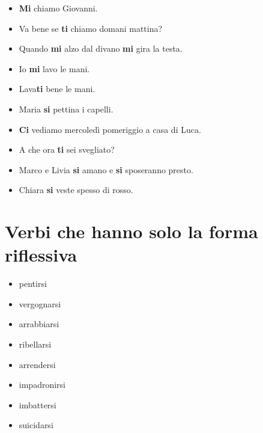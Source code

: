 \documentclass[letter,11pt]{article}
\begin{document}
\begin{multicols}{2}
\begin{itemize}

    \item {\bf Mi} chiamo Giovanni.
    \item Va bene se {\bf ti} chiamo domani mattina?
    \item Quando {\bf mi} alzo dal divano {\bf mi} gira la testa.
    \item Io {\bf mi} lavo le mani.
    \item Lava{\bf ti} bene le mani.
    \item Maria {\bf si} pettina i capelli.
    \item {\bf Ci} vediamo mercoledì pomeriggio a casa di Luca.
    \item A che ora {\bf ti} sei svegliato?
    \item Marco e Livia {\bf si} amano e {\bf si} sposeranno presto.
    \item Chiara {\bf si} veste spesso di rosso.


\end{itemize}
\end{multicols}

\vskip 0.2in
\section*{Verbi che hanno solo la forma riflessiva}
\vskip 0.2in

\begin{itemize}
\item pentirsi
\item vergognarsi
\item arrabbiarsi
\item ribellarsi
\item arrendersi
\item impadronirsi
\item imbattersi
\item suicidarsi

\end{itemize}
\end{document}
